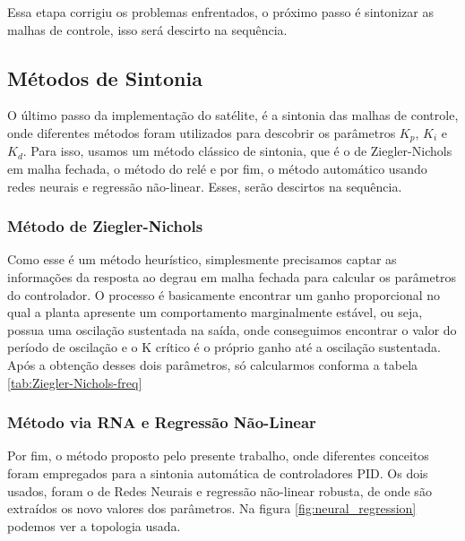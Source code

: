 Essa etapa corrigiu os problemas enfrentados, o próximo passo é sintonizar as malhas de controle, isso será descirto na sequência.


\subsection{Métodos de Sintonia}

O último passo da implementação do satélite, é a sintonia das malhas de controle, onde diferentes métodos foram utilizados para descobrir os parâmetros \textit{$K_p$}, \textit{$K_i$} e \textit{$K_d$}. Para isso, usamos um método clássico de sintonia, que é o de Ziegler-Nichols em malha fechada, o método do relé e por fim, o método automático usando redes neurais e regressão não-linear. Esses, serão descirtos na sequência. 



\subsubsection{Método de Ziegler-Nichols}

Como esse é um método heurístico, simplesmente precisamos captar as informações da resposta ao degrau em malha fechada para calcular os parâmetros do controlador. O processo é basicamente encontrar um ganho proporcional no qual a planta apresente um comportamento marginalmente estável, ou seja, possua uma oscilação sustentada na saída, onde conseguimos encontrar o valor do período de oscilação e o K crítico é o próprio ganho até a oscilação sustentada. Após a obtenção desses dois parâmetros, só calcularmos conforma a tabela \ref{tab:Ziegler-Nichols-freq}



\subsubsection{Método via RNA e Regressão Não-Linear}

Por fim, o método proposto pelo presente trabalho, onde diferentes conceitos foram empregados para a sintonia automática de controladores PID. Os dois usados, foram o de Redes Neurais e regressão não-linear robusta, de onde são extraídos os novo valores dos parâmetros. Na figura \ref{fig:neural_regression} podemos ver a topologia usada.

